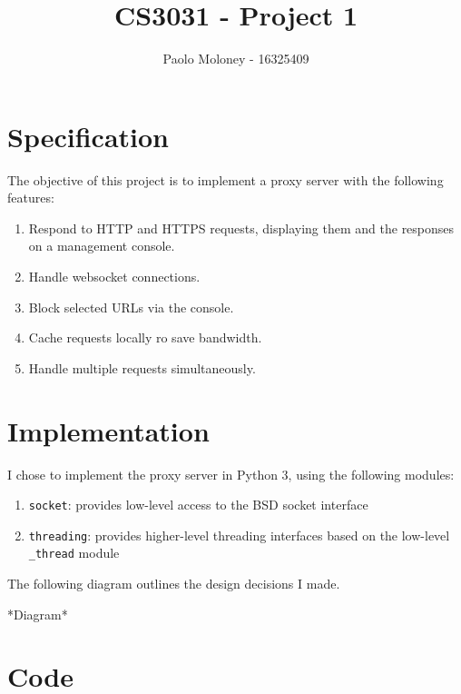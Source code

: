 \documentclass{article}
\title{CS3031 - Project 1}
\author{Paolo Moloney - 16325409}
\begin{document}
\maketitle
\newpage

\tableofcontents
\newpage

\section{Specification}

The objective of this project is to implement a proxy server with the following features:

\begin{enumerate}
	\item Respond to HTTP and HTTPS requests, displaying them and the responses on a management console.
	\item Handle websocket connections.
	\item Block selected URLs via the console.
	\item Cache requests locally ro save bandwidth.
	\item Handle multiple requests simultaneously.
\end{enumerate}

\newpage

\section{Implementation}

I chose to implement the proxy server in Python 3, using the following modules:

\begin{enumerate}
	\item \texttt{socket}: provides low-level access to the BSD socket interface
	\item \texttt{threading}: provides higher-level threading interfaces based on the low-level \texttt{\_thread} module
\end{enumerate}

The following diagram outlines the design decisions I made.

*Diagram*

\newpage

\section{Code}

\end{document}
